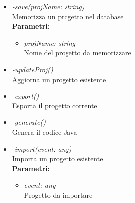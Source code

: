 \begin{itemize}
\begin{itemize}
\begin{itemize}
    		\end{itemize}
    		\item \emph{-save(projName: string)}\\
    		Memorizza un progetto nel database\\
    		\textbf{Parametri:}
    		\begin{itemize}
    			\item \emph{projName: string}\\
    			Nome del progetto da memorizzare
    		\end{itemize}
    		\item \emph{-updateProj()}\\
    		Aggiorna un progetto esistente
    		\item \emph{-export()}\\
    		Esporta il progetto corrente
    		\item \emph{-generate()}\\
    		Genera il codice Java
    		\item \emph{-import(event: any)}\\
    		Importa un progetto esistente\\
    		\textbf{Parametri:}
    		\begin{itemize}
    			\item \emph{event: any}\\
    			Progetto da importare
    		\end{itemize}
		\end{itemize}
\end{itemize}